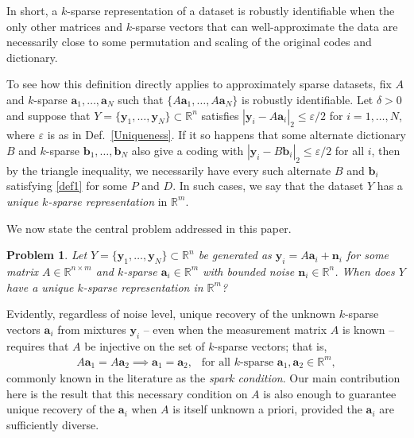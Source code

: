 \documentclass[journal, onecolumn]{IEEEtran}
\newtheorem{problem}{Problem}
\begin{document}
In short, a $k$-sparse representation of a dataset is robustly identifiable when the only other matrices and $k$-sparse vectors that can well-approximate the data are necessarily close to some permutation and scaling of the original codes and dictionary.  

To see how this definition directly applies to approximately sparse datasets, fix $A$ and $k$-sparse $\mathbf{a}_1, \ldots, \mathbf{a}_N$ such that $\{A\mathbf{a}_1, \ldots, A\mathbf{a}_N\}$ is robustly identifiable. Let $\delta > 0$ and suppose that $Y = \{\mathbf{y}_1, \ldots, \mathbf{y}_N\} \subset \mathbb{R}^n$ satisfies $|\mathbf{y}_i - A\mathbf{a}_i|_2 \leq \varepsilon/2$ for $i = 1, \ldots, N$, where $\varepsilon$ is as in Def.~\ref{Uniqueness}. %
If it so happens that some alternate dictionary $B$ and $k$-sparse $\mathbf{b}_1, \ldots, \mathbf{b}_N$ also give a coding with $|\mathbf{y}_i - B\mathbf{b}_i|_2 \leq \varepsilon/2$ for all $i$, then by the triangle inequality, we necessarily have every such alternate $B$ and $\mathbf{b}_i$ satisfying \eqref{def1} for some $P$ and $D$. 
In such cases, we say that the dataset $Y$ has a \textit{unique $k$-sparse representation} in $\mathbb{R}^m$. 

We now state the central problem addressed in this paper.

\begin{problem}\label{DUTproblem}
Let $Y = \{\mathbf{y}_1, \ldots, \mathbf{y}_N \} \subset \mathbb{R}^n$ be generated as $\mathbf{y}_i = A\mathbf{a}_i  + \mathbf{n}_i$ for some matrix $A \in \mathbb{R}^{n \times m}$ and $k$-sparse $\mathbf{a}_i \in \mathbb{R}^m$ with bounded noise $\mathbf{n}_i \in \mathbb{R}^n$. When does $Y$ have a unique $k$-sparse representation in $\mathbb{R}^m$?
\end{problem}

Evidently, regardless of noise level, unique recovery of the unknown $k$-sparse vectors $\mathbf{a}_i$ from mixtures $\mathbf{y}_i$ -- even when the measurement matrix $A$ is known -- requires that $A$ be injective on the set of $k$-sparse vectors; that is,
\begin{align}\label{SparkCondition}
A\mathbf{a}_1 = A\mathbf{a}_2 \implies \mathbf{a}_1 = \mathbf{a}_2, \ \ \text{ for all $k$-sparse } \mathbf{a}_1, \mathbf{a}_2 \in \mathbb{R}^m,
\end{align}
commonly known in the literature as the \emph{spark condition}. Our main contribution here is the result that this necessary condition on $A$ is also enough to guarantee unique recovery of the $\mathbf{a}_i$ when $A$ is itself unknown a priori, provided the $\mathbf{a}_i$ are sufficiently diverse.  
\end{document}
